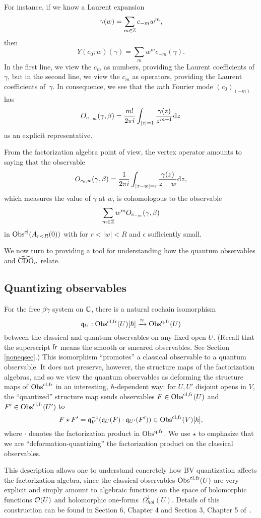 For instance, if we know a Laurent expansion
\[
\gamma(w) = \sum_{m \in \mathbb Z} c_{-m} w^m,
\]
then
\[
Y(c_0;w)(\gamma) = \sum_m w^m c_{-m}(\gamma).
\]
In the first line, we view the $c_m$ as numbers, providing the Laurent coefficients of $\gamma$,
but in the second line, we view the $c_m$ as operators, providing the Laurent coefficients of~$\gamma$.
In consequence, we see that the $m$th Fourier mode $(c_0)_{(-m)}$ has 
\[
O_{c_{-m}}(\gamma,\beta) = \frac{m!}{2 \pi i} \int_{|z| = 1} \frac{\gamma(z)}{z^{m+1}} {\rm d} z
\]
as an explicit representative.

From the factorization algebra point of view, 
the vertex operator amounts to saying that the observable
\[
O_{c_0,w}(\gamma,\beta) = \frac{1}{2 \pi i} \int_{|z-w| = \epsilon} \frac{\gamma(z)}{z-w} {\rm d} z,
\]
which measures the value of $\gamma$ at $w$, is cohomologous to the observable
\[
\sum_{m \in \mathbb Z} w^m O_{c_{-m}}(\gamma,\beta)
\]
in ${\rm Obs}^{{\rm cl}}(A_{r<R}(0))$ with for $r < |w| < R$ and $\epsilon$ sufficiently small. 

We now turn to providing a tool for understanding how the quantum observables
and $\widehat{\rm CDO}_n$ relate.

\subsection{Quantizing observables}
\label{sec quant map}

For the free $\beta\gamma$ system on $\mathbb C$, 
there is a natural cochain isomorphism 
\[
\frak{q}_U: {\rm Obs}^{{\rm cl},{\rm fr}}(U)[\hbar] \xrightarrow{\cong} {\rm Obs}^{{\rm q},{\rm fr}}(U)
\]
between the classical and quantum observables on any fixed open $U$.
(Recall that the superscript ${\rm fr}$ means the smooth or smeared observables.
See Section \ref{noneqsec}.)
This isomorphism ``promotes'' a classical observable to a quantum observable.
It does not preserve, however, the structure maps of the factorization algebras,
and so we view the quantum observables as deforming the structure maps of ${\rm Obs}^{{\rm cl},{\rm fr}}$ in an interesting, $\hbar$-dependent way:
for $U, U'$ disjoint opens in $V$, the ``quantized'' structure map sends observables 
$F \in {\rm Obs}^{{\rm cl},{\rm fr}}(U)$ and $F' \in {\rm Obs}^{{\rm cl},{\rm fr}}(U')$ to 
\[
F \star F' = \frak{q}_{V}^{-1}(\frak{q}_U(F) \cdot \frak{q}_{U'}(F')) \in {\rm Obs}^{{\rm cl},{\rm fr}}(V)[\hbar],
\]
where $\cdot$ denotes the factorization product in ${\rm Obs}^{{\rm q},{\rm fr}}$.
We use $\star$ to emphasize that we are ``deformation-quantizing'' the factorization product on the classical observables.

This description allows one to understand concretely how BV quantization affects the factorization algebra,
since the classical observables ${\rm Obs}^{{\rm cl},{\rm fr}}(U)$ are very explicit and simply amount to algebraic functions on the space of holomorphic functions $\mathcal O(U)$ and holomorphic one-forms~$\Omega^1_{hol}(U)$.
Details of this construction can be found in Section 6, Chapter 4 and Section 3, Chapter 5 of~\cite{CG1}.

